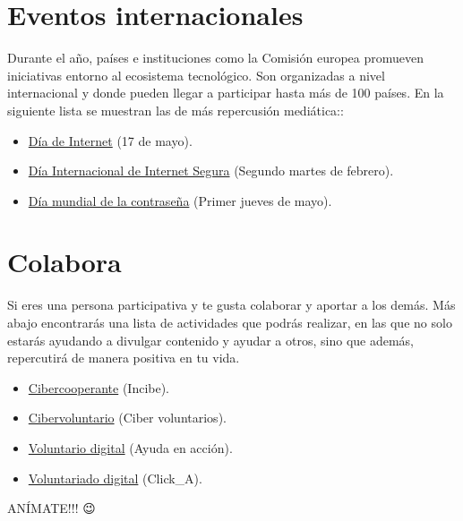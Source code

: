 \documentclass[
  a4paper,
  openany]{book}
\begin{document}
\hypertarget{eventos-internacionales}{%
\section{Eventos internacionales}\label{eventos-internacionales}}

Durante el año, países e instituciones como la Comisión europea promueven iniciativas entorno al ecosistema tecnológico. Son organizadas a nivel internacional y donde pueden llegar a participar hasta más de 100 países. En la siguiente lista se muestran las de más repercusión mediática::

\begin{itemize}
\item
  \href{https://es.wikipedia.org/wiki/Día_de_Internet}{Día de Internet} (17 de mayo).
\item
  \href{https://es.wikipedia.org/wiki/Día_Internacional_de_Internet_Segura}{Día Internacional de Internet Segura} (Segundo martes de febrero).
\item
  \href{https://es.wikipedia.org/wiki/Día_mundial_de_la_contraseña}{Día mundial de la contraseña} (Primer jueves de mayo).
\end{itemize}

\hypertarget{colabora}{%
\section{Colabora}\label{colabora}}

Si eres una persona participativa y te gusta colaborar y aportar a los demás. Más abajo encontrarás una lista de actividades que podrás realizar, en las que no solo estarás ayudando a divulgar contenido y ayudar a otros, sino que además, repercutirá de manera positiva en tu vida.

\begin{itemize}
\item
  \href{https://www.incibe.es/cibercooperantes/quiero-ser-cibercooperante}{Cibercooperante} (Incibe).
\item
  \href{https://www.cibervoluntarios.org/}{Cibervoluntario} (Ciber voluntarios).
\item
  \href{https://ayudaenaccion.org/ong/colabora/voluntariado-digital/}{Voluntario digital} (Ayuda en acción).
\item
  \href{https://twitter.com/Clicka_CRE}{Voluntariado digital} (Click\_A).
\end{itemize}

ANÍMATE!!! 😉
\end{document}
